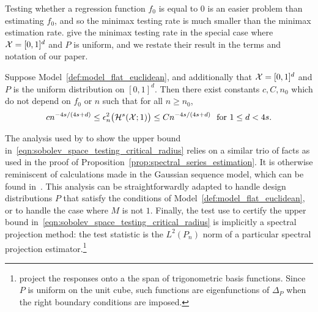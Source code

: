 Testing whether a regression function $f_0$ is equal to $0$ is an easier problem than estimating $f_0$, and so the minimax testing rate is much smaller than the minimax estimation rate. \citet{ingster2009} give the minimax testing rate in the special case where $\mathcal{X} = [0,1]^d$ and $P$ is uniform, and we restate their result in the terms and notation of our paper.
\begin{theorem}
	\label{thm:spectral_series_testing}
	Suppose Model~\ref{def:model_flat_euclidean}, and additionally that $\mathcal{X} = [0,1]^d$ and $P$ is the uniform distribution on $[0,1]^d$. Then there exist constants $c,C,n_0$ which do not depend on $f_0$ or $n$ such that for all $n \geq n_0$,
	\begin{equation}
	\label{eqn:sobolev_space_testing_critical_radius}
	c n^{-4s/(4s + d)} \leq \epsilon_n^2\bigl(\mathcal{H}^s(\mathcal{X};1)\bigr) \leq C n^{-4s/(4s + d)}~~\textrm{for $1 \leq d < 4s$.}
	\end{equation}
\end{theorem}
The analysis used by \citet{ingster2009} to show the upper bound in~\eqref{eqn:sobolev_space_testing_critical_radius} relies on a similar trio of facts as used in the proof of Proposition~\ref{prop:spectral_series_estimation}. It is otherwise reminiscent of calculations made in the Gaussian sequence model, which can be found in~\cite{ingster2012}. This analysis can be straightforwardly adapted to handle design distributions $P$ that satisfy the conditions of Model~\ref{def:model_flat_euclidean}, or to handle the case where $M$ is not $1$. Finally, the test \citet{ingster2009} use to certify the upper bound in~\eqref{eqn:sobolev_space_testing_critical_radius} is implicitly a spectral projection method: the test statistic is the $L^2(P_n)$ norm of a particular spectral projection estimator.\footnote{\cite{ingster2009} project the responses onto a the span of trigonometric basis functions. Since $P$ is uniform on the unit cube, such functions are eigenfunctions of $\Delta_P$ when the right boundary conditions are imposed.}

